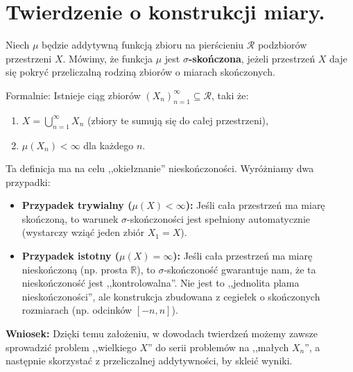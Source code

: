 \section{Twierdzenie o konstrukcji miary.}

\begin{definition}
    Niech $\mu$ będzie addytywną funkcją zbioru na pierścieniu $\mathcal{R}$ podzbiorów przestrzeni $X$.
    Mówimy, że funkcja $\mu$ jest \textbf{$\sigma$-skończona}, jeżeli przestrzeń $X$ daje się pokryć przeliczalną rodziną zbiorów o miarach skończonych.
    
    Formalnie: Istnieje ciąg zbiorów $(X_n)_{n=1}^{\infty} \subseteq \mathcal{R}$, taki że:
    \begin{enumerate}
        \item $X = \bigcup_{n=1}^{\infty} X_n$ \quad (zbiory te sumują się do całej przestrzeni),
        \item $\mu(X_n) < \infty$ dla każdego $n$.
    \end{enumerate}
\end{definition}

\begin{remark}
    Ta definicja ma na celu ,,okiełznanie'' nieskończoności. Wyróżniamy dwa przypadki:
    \begin{itemize}
        \item \textbf{Przypadek trywialny ($\mu(X) < \infty$):} Jeśli cała przestrzeń ma miarę skończoną, to warunek $\sigma$-skończoności jest spełniony automatycznie (wystarczy wziąć jeden zbiór $X_1 = X$).
        \item \textbf{Przypadek istotny ($\mu(X) = \infty$):} Jeśli cała przestrzeń ma miarę nieskończoną (np. prosta $\mathbb{R}$), to $\sigma$-skończoność gwarantuje nam, że ta nieskończoność jest ,,kontrolowalna''. Nie jest to ,,jednolita plama nieskończoności'', ale konstrukcja zbudowana z cegiełek o skończonych rozmiarach (np. odcinków $[-n, n]$).
    \end{itemize}
    \textbf{Wniosek:} Dzięki temu założeniu, w dowodach twierdzeń możemy zawsze sprowadzić problem ,,wielkiego $X$'' do serii problemów na ,,małych $X_n$'', a następnie skorzystać z przeliczalnej addytywności, by skleić wyniki.
\end{remark}

